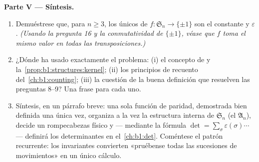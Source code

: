 \begin{problem}
\medskip
\noindent\textbf{Parte V --- Síntesis.}
\begin{enumerate}[resume]
  \item Demuéstrese que, para $n \geq 3$, los únicos  de
         $f \colon \mathfrak S_n \to \{\pm 1\}$ son el
         constante y $\varepsilon$. \emph{(Usando la
        pregunta 16 y la conmutatividad de $\{\pm1\}$, véase que $f$
        toma el mismo valor en todas las transposiciones.)}
  \item ¿Dónde ha usado exactamente el problema: (i) el concepto de
         y la~\cref{prop:b1:structures:kernel}; (ii) los
        principios de recuento del~\cref{ch:b1:counting}; (iii) la
        cuestión de la buena definición que resuelven las preguntas
        8--9? Una frase para cada uno.
  \item Síntesis, en un párrafo breve: una sola función de paridad,
        demostrada bien definida una única vez, organiza a la vez la
        estructura interna de $\mathfrak S_n$ (el 
        $\mathfrak A_n$), decide un rompecabezas físico y ---
        mediante la fórmula $\det = \sum_\sigma
        \varepsilon(\sigma)\cdots$ --- definirá los determinantes en
        el~\cref{ch:b1:det}. Coméntese el patrón recurrente: los
        invariantes convierten «pruébense todas las sucesiones de
        movimientos» en un único cálculo.
\end{enumerate}
\end{problem}
